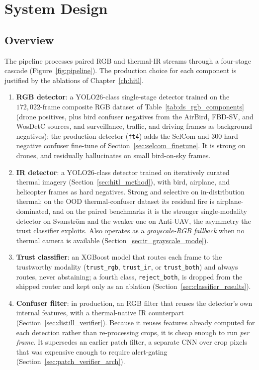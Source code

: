 \chapter{System Design}
\label{ch:architecture}

\section{Overview}

The pipeline processes paired RGB and thermal-IR streams through a four-stage cascade (Figure~\ref{fig:pipeline}). The production choice for each component is justified by the ablations of Chapter~\ref{ch:hitl}.

\begin{enumerate}
    \item \textbf{RGB detector}: a YOLO26-class single-stage detector trained on the $172{,}022$-frame composite RGB dataset of Table~\ref{tab:ds_rgb_components} (drone positives, plus bird confuser negatives from the AirBird, FBD-SV, and WosDetC sources, and surveillance, traffic, and driving frames as background negatives); the production detector (\texttt{ft4}) adds the SelCom and $300$-hard-negative confuser fine-tune of Section~\ref{sec:selcom_finetune}. It is strong on drones, and residually hallucinates on small bird-on-sky frames.
    \item \textbf{IR detector}: a YOLO26-class detector trained on iteratively curated thermal imagery (Section~\ref{sec:hitl_method}), with bird, airplane, and helicopter frames as hard negatives. Strong and selective on in-distribution thermal; on the OOD thermal-confuser dataset its residual fire is airplane-dominated, and on the paired benchmarks it is the stronger single-modality detector on Svanstr\"om and the weaker one on Anti-UAV, the asymmetry the trust classifier exploits. Also operates as a \emph{grayscale-RGB fallback} when no thermal camera is available (Section~\ref{sec:ir_grayscale_mode}).
    \item \textbf{Trust classifier}: an XGBoost model that routes each frame to the trustworthy modality (\texttt{trust\_rgb}, \texttt{trust\_ir}, or \texttt{trust\_both}) and always routes, never abstaining; a fourth class, \texttt{reject\_both}, is dropped from the shipped router and kept only as an ablation (Section~\ref{sec:classifier_results}).
    \item \textbf{Confuser filter}: in production, an RGB filter that reuses the detector's own internal features, with a thermal-native IR counterpart (Section~\ref{sec:distill_verifier}). Because it reuses features already computed for each detection rather than re-processing crops, it is cheap enough to run \emph{per frame}. It supersedes an earlier patch filter, a separate CNN over crop pixels that was expensive enough to require alert-gating (Section~\ref{sec:patch_verifier_arch}).
\end{enumerate}

